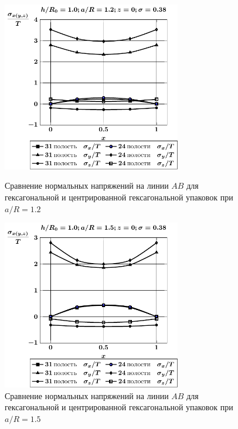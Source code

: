 \begin{figure}[h!]
\centering\footnotesize
\parbox[b]{7.5cm}{\centering\includegraphics[width=7.8cm]{cav31-24-a12-h10-r10-z0.pdf}
\caption{Сравнение нормальных напряжений на линии $AB$ для гексагональной и центрированной гексагональной упаковок при $a/R=1.2$
\label{f:7:138}}}\hfil\hfil
\parbox[b]{7.5cm}{\centering\includegraphics[width=7.8cm]{cav31-24-a15-h10-r10-z0.pdf}
\caption{Сравнение нормальных напряжений на линии $AB$ для гексагональной и центрированной гексагональной упаковок при $a/R=1.5$
\label{f:7:139}}}
\end{figure}

